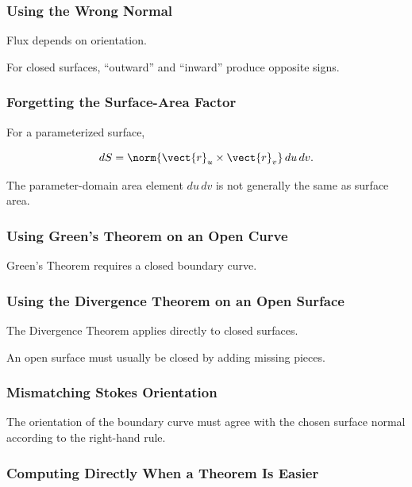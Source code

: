 \subsubsection{Using the Wrong Normal}

Flux depends on orientation.

For closed surfaces, ``outward'' and ``inward'' produce opposite signs.

\subsubsection{Forgetting the Surface-Area Factor}

For a parameterized surface,

\[ dS=\norm{\vect{r}_u\times\vect{r}_v}\,du\,dv. \]

The parameter-domain area element \(du\,dv\) is not generally the same as
surface area.

\subsubsection{Using Green's Theorem on an Open Curve}

Green's Theorem requires a closed boundary curve.

\subsubsection{Using the Divergence Theorem on an Open Surface}

The Divergence Theorem applies directly to closed surfaces.

An open surface must usually be closed by adding missing pieces.

\subsubsection{Mismatching Stokes Orientation}

The orientation of the boundary curve must agree with the chosen surface
normal according to the right-hand rule.

\subsubsection{Computing Directly When a Theorem Is Easier}

